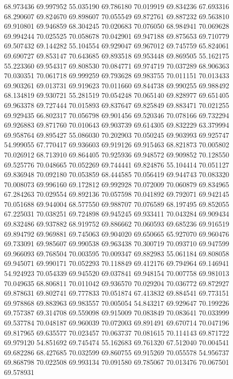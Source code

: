 68.973436
69.997952
55.035190
69.786180
70.019919
69.834236
67.693316
68.290607
69.824670
69.898607
70.055549
69.872761
69.887232
69.563810
69.910801
69.946859
68.304245
70.020683
70.076050
68.984941
70.069628
69.994244
70.025525
70.058678
70.042901
69.947188
69.875653
69.710779
69.507432
69.144282
55.104554
69.929047
69.967012
69.745759
65.824061
69.690727
69.853147
70.643685
69.893518
69.953448
69.869505
55.162175
55.223360
69.954317
69.808530
70.084771
69.974719
70.037289
68.906363
70.030351
70.061718
69.999259
69.793628
69.983755
70.011151
70.013433
69.903261
69.013731
69.919623
70.011660
69.844738
69.990255
69.988492
68.134819
69.930721
55.281519
70.054248
70.065140
69.828977
69.651405
69.963378
69.727444
70.015893
69.837647
69.825849
69.883471
70.021255
69.929435
66.802317
70.056798
69.901456
69.520346
70.078166
69.732294
69.926883
69.871760
70.010643
69.903739
69.614305
69.832229
63.379994
69.958764
69.895427
55.086030
70.202903
70.050245
69.903993
69.925747
54.999055
67.770417
69.936603
69.919126
69.915463
68.821873
70.005802
70.026912
68.713910
69.864405
70.925936
69.948572
69.909852
70.128550
69.525776
70.048665
70.052269
69.744441
69.824876
55.104414
70.051127
69.836948
70.092180
70.053859
68.444585
70.056419
69.944743
70.083320
70.008073
69.996160
69.172812
69.992928
70.072009
70.060879
69.834965
67.284263
70.029554
69.892136
70.057598
70.041892
69.792071
69.942145
70.051688
69.944004
68.577550
69.988707
70.076589
68.197495
69.852055
67.225031
70.038251
69.724898
69.945245
69.933411
70.043284
69.909434
69.832486
69.937882
68.919752
69.886662
70.060593
69.685236
69.916519
69.894792
69.969881
69.745063
69.904020
69.650665
65.927070
69.960476
69.733091
69.985607
69.990538
69.963438
70.300719
70.093710
69.947599
69.966093
69.768504
70.003595
70.009347
69.882983
55.061184
69.808058
69.945071
69.990171
70.052293
70.118849
69.412176
69.794964
69.146941
54.924923
70.054339
69.945520
69.037841
69.948154
70.007758
69.981013
70.049635
68.806811
70.011042
69.936570
70.029204
70.036772
69.872927
69.878631
69.802741
69.777833
70.051874
67.413832
69.884541
69.773151
69.978868
69.883963
69.983557
70.005054
54.843217
69.929647
70.199226
69.757387
69.314708
69.559098
69.915009
70.083849
70.083641
70.033999
69.537784
70.048187
69.960039
70.072003
69.891491
69.670714
70.047196
69.817965
69.635577
70.023457
70.063737
70.081615
70.114143
69.871722
69.979120
54.851692
69.745474
55.162683
69.761320
67.512040
70.004541
69.682286
68.427685
70.032599
69.860755
69.915269
70.055578
54.956737
69.868798
70.022508
69.993134
70.091580
69.785067
70.013476
70.067501
69.578931
